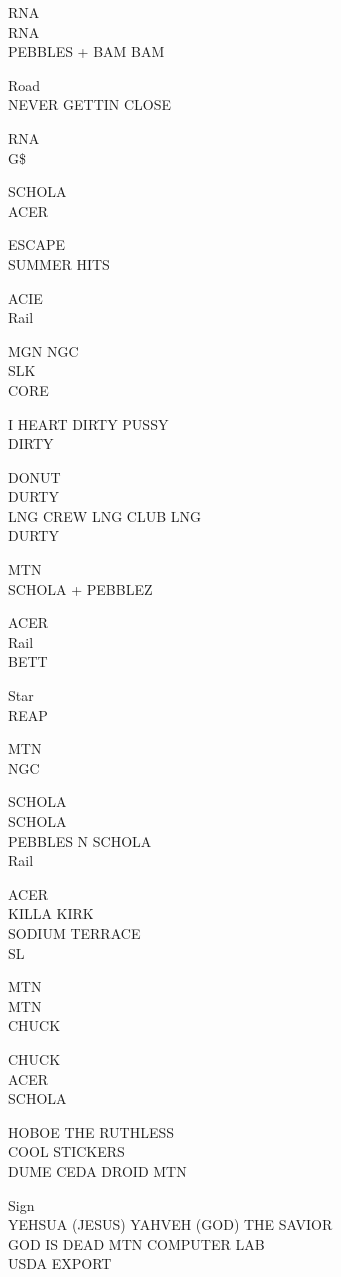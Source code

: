 \documentclass[10pt,letterpaper]{article}
\begin{document}
RNA\\
RNA\\
PEBBLES + BAM BAM

Road\\
NEVER GETTIN CLOSE

RNA\\
G\$

SCHOLA\\
ACER

ESCAPE\\
SUMMER HITS

ACIE\\
Rail

MGN NGC\\
SLK\\
CORE

I HEART DIRTY PUSSY\\
DIRTY

DONUT\\
DURTY\\
LNG CREW LNG CLUB LNG\\
DURTY

MTN\\
SCHOLA + PEBBLEZ

ACER\\
Rail\\
BETT

Star\\
REAP

MTN\\
NGC

SCHOLA\\
SCHOLA\\
PEBBLES N SCHOLA\\
Rail

ACER\\
KILLA KIRK\\
SODIUM TERRACE\\
SL

MTN\\
MTN\\
CHUCK

CHUCK\\
ACER\\
SCHOLA

HOBOE THE RUTHLESS\\
COOL STICKERS\\
DUME CEDA DROID MTN

Sign\\
YEHSUA (JESUS) YAHVEH (GOD) THE SAVIOR\\
GOD IS DEAD MTN COMPUTER LAB\\
USDA EXPORT
\end{document}

